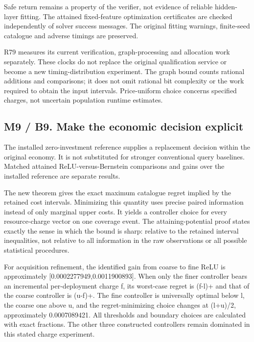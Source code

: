 Safe return remains a property of the verifier, not evidence of reliable
hidden-layer fitting. The attained fixed-feature optimization
certificates are checked independently of solver success messages. The
original fitting warnings, finite-seed catalogue and adverse timings are
preserved.

R79 measures its current verification, graph-processing and allocation
work separately. These clocks do not replace the original qualification
service or become a new timing-distribution experiment. The graph bound
counts rational additions and comparisons; it does not omit rational bit
complexity or the work required to obtain the input intervals.
Price-uniform choice concerns specified charges, not uncertain
population runtime estimates.

\hypertarget{m9-b9.-make-the-economic-decision-explicit}{%
\subsection{M9 / B9. Make the economic decision
explicit}\label{m9-b9.-make-the-economic-decision-explicit}}

The installed zero-investment reference supplies a replacement decision
within the original economy. It is not substituted for stronger
conventional query baselines. Matched attained ReLU-versus-Bernstein
comparisons and gains over the installed reference are separate results.

The new theorem gives the exact maximum catalogue regret implied by the
retained cost intervals. Minimizing this quantity uses precise paired
information instead of only marginal upper costs. It yields a controller
choice for every resource-charge vector on one coverage event. The
attaining-potential proof states exactly the sense in which the bound is
sharp: relative to the retained interval inequalities, not relative to
all information in the raw observations or all possible statistical
procedures.

For acquisition refinement, the identified gain from coarse to fine ReLU
is approximately {[}0.0002277949,0.0011900893{]}. When only the finer
controller bears an incremental per-deployment charge f, its worst-case
regret is (f-l)+ and that of the coarse controller is (u-f)+. The fine
controller is universally optimal below l, the coarse one above u, and
the regret-minimizing choice changes at (l+u)/2, approximately
0.0007089421. All thresholds and boundary choices are calculated with
exact fractions. The other three constructed controllers remain
dominated in this stated charge experiment.

